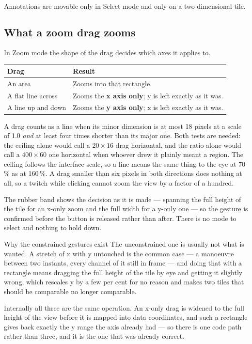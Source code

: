 \documentclass[11pt,a4paper,oneside]{report}
\begin{document}
Annotations are movable only in Select mode and only on a two-dimensional tile.

\subsection{What a zoom drag zooms}
\label{sec:zoomdrag}

In Zoom mode the shape of the drag decides which axes it applies to.

\begin{center}
\small
\begin{tabular}{@{}p{}p{}@{}}
\toprule
\textbf{Drag} & \textbf{Result} \\
\midrule
An area & Zooms into that rectangle. \\
A flat line across & Zooms the \textbf{x axis only}; y is left exactly as it was. \\
A line up and down & Zooms the \textbf{y axis only}; x is left exactly as it was. \\
\bottomrule
\end{tabular}
\end{center}

A drag counts as a line when its minor dimension is at most 18 pixels at a
scale of 1.0 \emph{and} at least four times shorter than its major one. Both
tests are needed: the ceiling alone would call a $20 \times 16$ drag
horizontal, and the ratio alone would call a $400 \times 60$ one horizontal
when whoever drew it plainly meant a region. The ceiling follows the interface
scale, so a line means the same thing to the eye at 70\,\% as at 160\,\%.
A drag smaller than six pixels in both directions does nothing at all, so a
twitch while clicking cannot zoom the view by a factor of a hundred.

The rubber band shows the decision as it is made --- spanning the full height of
the tile for an x-only zoom and the full width for a y-only one --- so the
gesture is confirmed before the button is released rather than after. There is
no mode to select and nothing to hold down.

\begin{aoenote}{Why the constrained gestures exist}
The unconstrained one is usually not what is wanted. A stretch of x with y
untouched is the common case --- a manoeuvre between two instants, every channel
of it still in frame --- and doing that with a rectangle means dragging the full
height of the tile by eye and getting it slightly wrong, which rescales y by a
few per cent for no reason and makes two tiles that should be comparable no
longer comparable.

Internally all three are the same operation. An x-only drag is widened to the
full height of the view before it is mapped into data coordinates, and such a
rectangle gives back exactly the y range the axis already had --- so there is
one code path rather than three, and it is the one that was already correct.
\end{aoenote}
\end{document}
